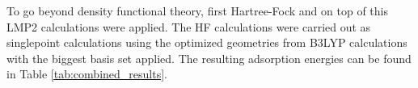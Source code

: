 \documentclass[11pt,DIV=13,BCOR=5mm,a4paper,headinclude]{scrbook}
\begin{document}
To go beyond density functional theory, first Hartree-Fock and on top of this LMP2 calculations were applied.
The HF calculations were carried out as singlepoint calculations using the optimized geometries from B3LYP calculations with the biggest basis set applied.
The resulting adsorption energies can be found in Table \ref{tab:combined_results}. %
\end{document}
